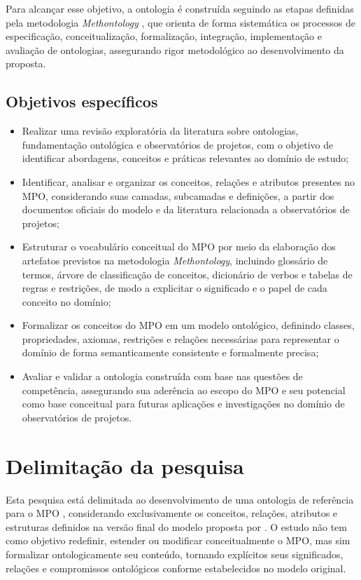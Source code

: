 Para alcançar esse objetivo, a ontologia é construída seguindo as etapas definidas pela metodologia \textit{Methontology} \cite{fernandez1997methontology}, que orienta de forma sistemática os processos de especificação, conceitualização, formalização, integração, implementação e avaliação de ontologias, assegurando rigor metodológico ao desenvolvimento da proposta.

\subsection{Objetivos específicos}

\begin{itemize}
    \item Realizar uma revisão exploratória da literatura sobre ontologias, fundamentação ontológica e observatórios de projetos, com o objetivo de identificar abordagens, conceitos e práticas relevantes ao domínio de estudo;
    \item Identificar, analisar e organizar os conceitos, relações e atributos presentes no MPO, considerando suas camadas, subcamadas e definições, a partir dos documentos oficiais do modelo e da literatura relacionada a observatórios de projetos;
    \item Estruturar o vocabulário conceitual do MPO por meio da elaboração dos artefatos previstos na metodologia \textit{Methontology}, incluindo glossário de termos, árvore de classificação de conceitos, dicionário de verbos e tabelas de regras e restrições, de modo a explicitar o significado e o papel de cada conceito no domínio;
    \item Formalizar os conceitos do MPO em um modelo ontológico, definindo classes, propriedades, axiomas, restrições e relações necessárias para representar o domínio de forma semanticamente consistente e formalmente precisa;
    \item Avaliar e validar a ontologia construída com base nas questões de competência, assegurando sua aderência ao escopo do MPO e seu potencial como base conceitual para futuras aplicações e investigações no domínio de observatórios de projetos.
\end{itemize}

\section{Delimitação da pesquisa}
Esta pesquisa está delimitada ao desenvolvimento de uma ontologia de referência para o MPO \cite{vieira2022thesis}, considerando exclusivamente os conceitos, relações, atributos e estruturas definidos na versão final do modelo proposta por \citeauthor{vieira2022thesis}. O estudo não tem como objetivo redefinir, estender ou modificar conceitualmente o MPO, mas sim formalizar ontologicamente seu conteúdo, tornando explícitos seus significados, relações e compromissos ontológicos conforme estabelecidos no modelo original.

